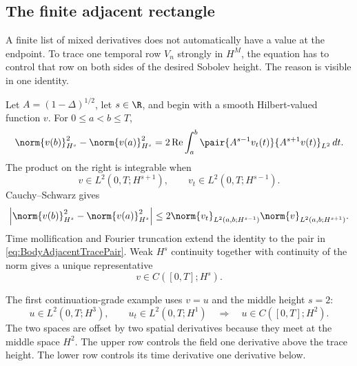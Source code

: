 \subsection{The finite adjacent rectangle}\label{sub:BodyFiniteAdjacentRectangles}

A finite list of mixed derivatives does not automatically have a value at the endpoint.
To trace one temporal row \(V_n\) strongly in \(H^M\), the equation has to control that row on both sides of the desired Sobolev height.
The reason is visible in one identity.

Let \(A=(1-\Delta)^{1/2}\), let \(s\in\R\), and begin with a smooth Hilbert-valued function \(v\).
For \(0\leq a<b\leq T\),
\begin{equation}\label{eq:BodyAdjacentTraceIdentity}
  \norm{v(b)}_{H^s}^2-
  \norm{v(a)}_{H^s}^2
  =2\operatorname{Re}
  \int_a^b
  \pair{A^{s-1}v_t(t)}{A^{s+1}v(t)}_{L^2}\,dt.
\end{equation}
The product on the right is integrable when
\begin{equation}\label{eq:BodyAdjacentTracePair}
  v\in L^2(0,T;H^{s+1}),
  \qquad
  v_t\in L^2(0,T;H^{s-1}).
\end{equation}
Cauchy--Schwarz gives
\begin{equation}\label{eq:BodyAdjacentTraceEstimate}
  \left|
  \norm{v(b)}_{H^s}^2-
  \norm{v(a)}_{H^s}^2
  \right|
  \leq
  2\norm{v_t}_{L^2(a,b;H^{s-1})}
  \norm{v}_{L^2(a,b;H^{s+1})}.
\end{equation}
Time mollification and Fourier truncation extend the identity to the pair in \eqref{eq:BodyAdjacentTracePair}.
Weak \(H^s\) continuity together with continuity of the norm gives a unique representative
\begin{equation}\label{eq:BodyAdjacentTraceConclusion}
  v\in C([0,T];H^s).
\end{equation}

The first continuation-grade example uses \(v=u\) and the middle height \(s=2\):
\begin{equation}\label{eq:FirstConcreteAdjacentPair}
  u\in L^2(0,T;H^3),
  \qquad
  u_t\in L^2(0,T;H^1)
  \quad\Longrightarrow\quad
  u\in C([0,T];H^2).
\end{equation}
The two spaces are offset by two spatial derivatives because they meet at the middle space \(H^2\).
The upper row controls the field one derivative above the trace height.
The lower row controls its time derivative one derivative below.

